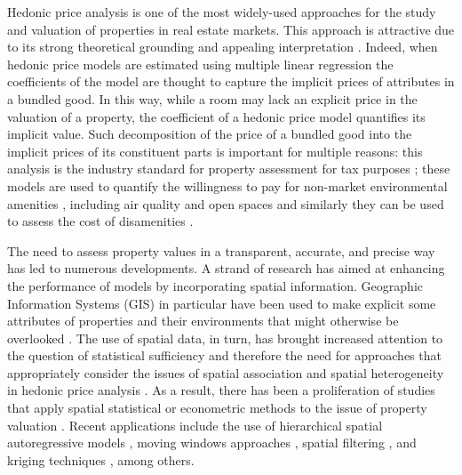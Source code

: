 \documentclass[Royal,times,sageh]{sagej}
\begin{document}
Hedonic price analysis is one of the most widely-used approaches for the
study and valuation of properties in real estate markets. This approach
is attractive due to its strong theoretical grounding and appealing
interpretation \citep{Rosen1974hedonic}. Indeed, when hedonic price
models are estimated using multiple linear regression the coefficients
of the model are thought to capture the implicit prices of attributes in
a bundled good. In this way, while a room may lack an explicit price in
the valuation of a property, the coefficient of a hedonic price model
quantifies its implicit value. Such decomposition of the price of a
bundled good into the implicit prices of its constituent parts is
important for multiple reasons: this analysis is the industry standard
for property assessment for tax purposes \citep{Morillo2017application};
these models are used to quantify the willingness to pay for non-market
environmental amenities \citep{Montero2018estimating}, including air
quality and open spaces and similarly they can be used to assess the
cost of disamenities \citep[e.g.,][]{vonGraevenitz2018amenity}.

The need to assess property values in a transparent, accurate, and
precise way has led to numerous developments. A strand of research has
aimed at enhancing the performance of models by incorporating spatial
information. Geographic Information Systems (GIS) in particular have
been used to make explicit some attributes of properties and their
environments that might otherwise be overlooked \citep{Paterson2002out}.
The use of spatial data, in turn, has brought increased attention to the
question of statistical sufficiency and therefore the need for
approaches that appropriately consider the issues of spatial association
and spatial heterogeneity in hedonic price analysis
\citep{Pace1997spatial, Paez2001spatial}. As a result, there has been a
proliferation of studies that apply spatial statistical or econometric
methods to the issue of property valuation \citep{Paez2009recent}.
Recent applications include the use of hierarchical spatial
autoregressive models \citep{Cellmer2019application}, moving windows
approaches \citep{Paez2008moving}, spatial filtering
\citep{Helbich2016spatially}, and kriging techniques
\citep{Montero2009estimating}, among others.
\end{document}
